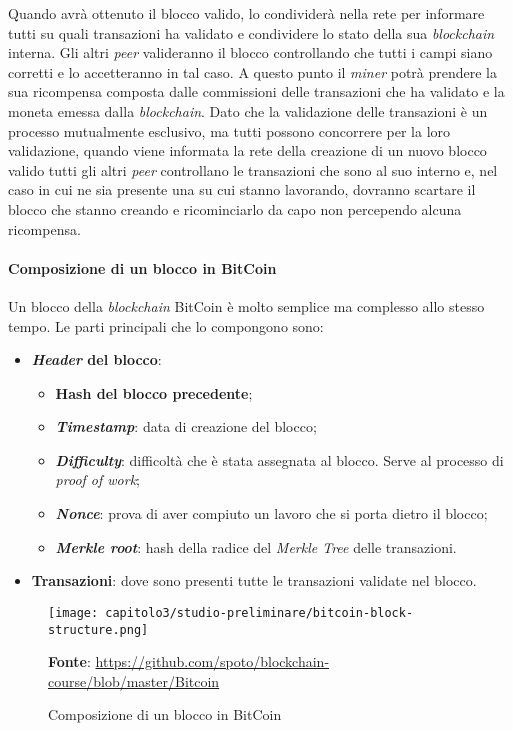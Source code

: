 Quando avrà ottenuto il blocco valido, lo condividerà nella rete per informare tutti su quali transazioni ha validato e condividere lo stato della sua \textit{blockchain} interna. Gli altri \textit{peer} valideranno il blocco controllando che tutti i campi siano corretti e lo accetteranno in tal caso. A questo punto il \textit{miner} potrà prendere la sua ricompensa composta dalle commissioni delle transazioni che ha validato e la moneta emessa dalla \textit{blockchain}. Dato che la validazione delle transazioni è un processo mutualmente esclusivo, ma tutti possono concorrere per la loro validazione, quando viene informata la rete della creazione di un nuovo blocco valido tutti gli altri \textit{peer} controllano le transazioni che sono al suo interno e, nel caso in cui ne sia presente una su cui stanno lavorando, dovranno scartare il blocco che stanno creando e ricominciarlo da capo non percependo alcuna ricompensa.

\paragraph{Composizione di un blocco in BitCoin}

Un blocco della \textit{blockchain} BitCoin è molto semplice ma complesso allo stesso tempo. Le parti principali che lo compongono sono:

\begin{itemize}
  \item \textbf{\textit{Header} del blocco}:
  \begin{itemize}
    \item \textbf{Hash del blocco precedente};
    \item \textbf{\textit{Timestamp}}: data di creazione del blocco;
    \item \textbf{\textit{Difficulty}}: difficoltà che è stata assegnata al blocco. Serve al processo di \textit{proof of work};
    \item \textbf{\textit{Nonce}}: prova di aver compiuto un lavoro che si porta dietro il blocco;
    \item \textbf{\textit{Merkle root}}: hash della radice del \textit{Merkle Tree} delle transazioni.
  \end{itemize}
  
  \item \textbf{Transazioni}: dove sono presenti tutte le transazioni validate nel blocco.
\end{itemize}

\begin{figure}[h!]
  \centering
  \texttt{[image: capitolo3/studio-preliminare/bitcoin-block-structure.png]}
  \caption{Composizione di un blocco in BitCoin}
  \textbf{Fonte}: \href{https://github.com/spoto/blockchain-course/blob/master/Bitcoin}{https://github.com/spoto/blockchain-course/blob/master/Bitcoin}
\end{figure}


